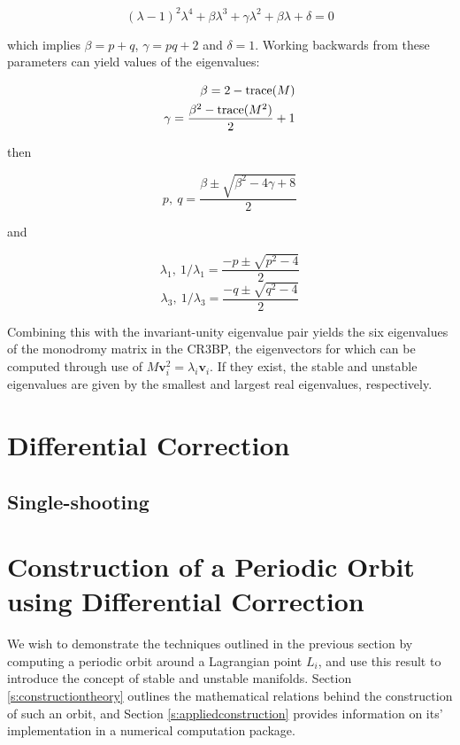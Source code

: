 \begin{equation}
(\lambda-1)^2\lambda^4 + \beta \lambda^3 + \gamma \lambda^2 + \beta \lambda + \delta = 0
\end{equation}

\noindent which implies $\beta = p+q$, $\gamma = pq + 2$ and $\delta = 1$. Working backwards from these parameters can yield values of the eigenvalues:

\begin{align}
\beta = 2 - \textnormal{trace}(M) \\
\gamma = \frac{\beta^2 - \textnormal{trace}(M^2)}{2} + 1
\end{align}

\noindent then

\begin{equation}
p,~q = \frac{\beta \pm \sqrt{\beta^2 - 4\gamma+8}}{2}
\end{equation}

\noindent and

\begin{equation}
\lambda_1,~1/\lambda_1 = \frac{-p \pm \sqrt{p^2 - 4}}{2}
\end{equation}
\begin{equation}
\lambda_3,~1/\lambda_3 = \frac{-q \pm \sqrt{q^2 - 4}}{2}
\end{equation}

\noindent Combining this with the invariant-unity eigenvalue pair yields the six eigenvalues of the monodromy matrix in the CR3BP, the eigenvectors for which can be computed through use of $M\pmb{v}^2_i = \lambda_i\pmb{v}_i$. If they exist, the stable and unstable eigenvalues are given by the smallest and largest real eigenvalues, respectively.

\section{Differential Correction}\label{s:differentialcorrection}

\subsection{Single-shooting}\label{s:singleshooting}

\section{Construction of a Periodic Orbit using Differential Correction}

We wish to demonstrate the techniques outlined in the previous section by computing a periodic orbit around a Lagrangian point $L_i$, and use this result to introduce the concept of stable and unstable manifolds. Section \ref{s:constructiontheory} outlines the mathematical relations behind the construction of such an orbit, and Section \ref{s:appliedconstruction} provides information on its' implementation in a numerical computation package.

